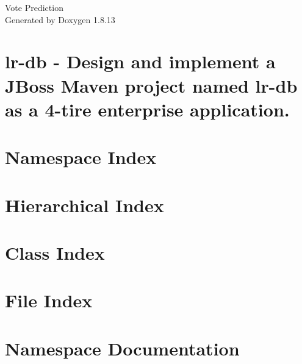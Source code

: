\documentclass[twoside]{book}
\newcommand{\+}{\discretionary{\mbox{\scriptsize$\hookleftarrow$}}{}{}}
\newcommand{\clearemptydoublepage}{%
  \newpage{\pagestyle{empty}\cleardoublepage}%
}
\begin{document}
\hypersetup{pageanchor=false,
             bookmarksnumbered=true,
             pdfencoding=unicode
            }
\begin{titlepage}
\vspace*{7cm}
\begin{center}%
{\Large Vote Prediction }\\
\vspace*{1cm}
{\large Generated by Doxygen 1.8.13}\\
\end{center}
\end{titlepage}
\clearemptydoublepage
{}
\tableofcontents
\clearemptydoublepage
{}
\hypersetup{pageanchor=true}

\chapter{lr-\/db -\/ Design and implement a J\+Boss Maven project named lr-\/db as a 4-\/tire enterprise application.}
\label{md__r_e_a_d_m_e}

\chapter{Namespace Index}

\chapter{Hierarchical Index}

\chapter{Class Index}

\chapter{File Index}

\chapter{Namespace Documentation}







\end{document}
